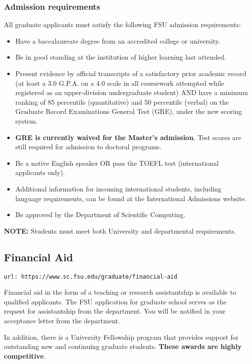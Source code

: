 \documentclass[12pt,a4paper]{article}
\begin{document}
\subsubsection*{Admission requirements}
All graduate applicants must satisfy the following FSU admission requirements:
\begin{itemize}
    \item Have a baccalaureate degree from an accredited college or university.
    \item Be in good standing at the institution of higher learning last attended.
    \item Present evidence by official transcripts of a satisfactory prior academic record (at least a 3.0 G.P.A. on a 4.0 scale in all coursework attempted while registered as an upper-division undergraduate student) AND have a minimum ranking of 85 percentile (quantitative) and 50 percentile (verbal) on the Graduate Record Examinations General Test (GRE), under the new scoring system.
    \item \textbf{GRE is currently waived for the Master's admission}. Test scores are still required for admission to doctoral programs.
    \item Be a native English speaker OR pass the TOEFL test (international applicants only).
    \item Additional information for incoming international students, including language requirements, can be found at the International Admissions website.
    \item Be approved by the Department of Scientific Computing.
\end{itemize}
\textbf{NOTE:} Students must meet both University and departmental requirements.

\subsection{Financial Aid}
\texttt{url: https://www.sc.fsu.edu/graduate/financial-aid}

Financial aid in the form of a teaching or research assistantship is available to qualified applicants. The FSU application for graduate school serves as the request for assistantship from the department. You will be notified in your acceptance letter from the department.

In addition, there is a University Fellowship program that provides support for outstanding new and continuing graduate students. \textbf{These awards are highly competitive}.
\end{document}
